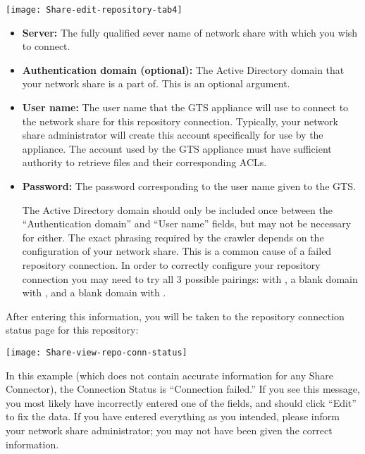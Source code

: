 \texttt{[image: Share-edit-repository-tab4]}

\begin{itemize}

\item \textbf{Server:} The fully qualified sever name of network share
with which you wish to connect.

\item \textbf{Authentication domain (optional):} The Active Directory
domain that your network share is a part of. This is an optional
argument. 

\item \textbf{User name:} The user name that the GTS appliance will
use to connect to the network share for this repository connection.
Typically, your network share administrator will create this account
specifically for use by the appliance. The account used by the GTS
appliance must have sufficient authority to retrieve files and their
corresponding ACLs.

\item \textbf{Password:} The password corresponding to the
user name given to the GTS.

The Active Directory domain should only be included once between the
``Authentication domain'' and ``User name'' fields, but may not be
necessary for either. The exact phrasing required by the crawler
depends on the configuration of your network share. This is a common
cause of a failed repository connection. In order to correctly
configure your repository connection you may need to try all 3
possible pairings:  with , a
blank domain with , and a blank
domain with .

\end{itemize}



After entering this information, you will be taken to the repository 
connection status page for this repository:

\texttt{[image: Share-view-repo-conn-status]}

In this example (which does not contain accurate information for any
Share Connector), the Connection Status is ``Connection failed.''  If
you see this message, you most likely have incorrectly entered one of
the fields, and should click ``Edit'' to fix the data. If you have
entered everything as you intended, please inform your network share
administrator; you may not have been given the correct information.
